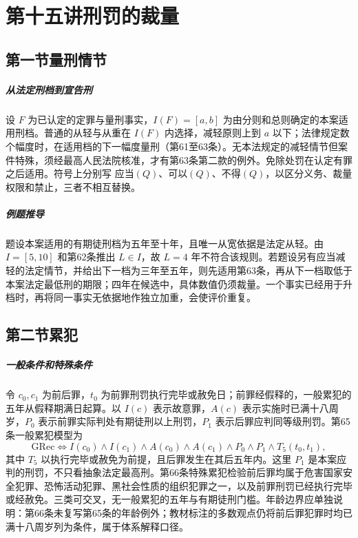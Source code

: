 \chapter{第十五讲\quad 刑罚的裁量}
\label{lecture:15}
\par

\section{第一节\quad 量刑情节}
\paragraph{从法定刑档到宣告刑}
设 \(F\) 为已认定的定罪与量刑事实，\(I(F)=[a,b]\) 为由分则和总则确定的本案适用刑档。普通的从轻与从重在 \(I(F)\) 内选择，减轻原则上到 \(a\) 以下；法律规定数个幅度时，在适用档的下一幅度量刑（第61至63条）。无本法规定的减轻情节但案件特殊，须经最高人民法院核准，才有第63条第二款的例外。免除处罚在认定有罪之后适用。符号上分别写 \(\text{应当}(Q)\)、\(\text{可以}(Q)\)、\(\text{不得}(Q)\)，以区分义务、裁量权限和禁止，三者不相互替换。

\paragraph{例题推导}
题设本案适用的有期徒刑档为五年至十年，且唯一从宽依据是法定从轻。由 \(I=[5,10]\) 和第62条推出 \(L\in I\)，故 \(L=4\) 年不符合该规则。若题设另有应当减轻的法定情节，并给出下一档为三年至五年，则先适用第63条，再从下一档取低于本案法定最低刑的期限；四年在候选中，具体数值仍须裁量。一个事实已经用于升档时，再将同一事实无依据地作独立加重，会使评价重复。

\section{第二节\quad 累犯}
\paragraph{一般条件和特殊条件}
令 \(c_0,c_1\) 为前后罪，\(t_0\) 为前罪刑罚执行完毕或赦免日；前罪经假释的，一般累犯的五年从假释期满日起算。以 \(I(c)\) 表示故意罪，\(A(c)\) 表示实施时已满十八周岁，\(P_0\) 表示前罪实际判处有期徒刑以上刑罚，\(P_1\) 表示后罪应判同等级刑罚。第65条一般累犯模型为
\[
 \mathrm{GRec}\iff
 I(c_0)\land I(c_1)\land A(c_0)\land A(c_1)
 \land P_0\land P_1\land T_5(t_0,t_1),
\]
其中 \(T_5\) 以执行完毕或赦免为前提，且后罪发生在其后五年内。这里 \(P_1\) 是本案应判的刑罚，不只看抽象法定最高刑。第66条特殊累犯检验前后罪均属于危害国家安全犯罪、恐怖活动犯罪、黑社会性质的组织犯罪之一，以及前罪刑罚已经执行完毕或经赦免。三类可交叉，无一般累犯的五年与有期徒刑门槛。年龄边界应单独说明：第66条未复写第65条的年龄例外；教材标注的多数观点仍将前后罪犯罪时均已满十八周岁列为条件，属于体系解释口径。

